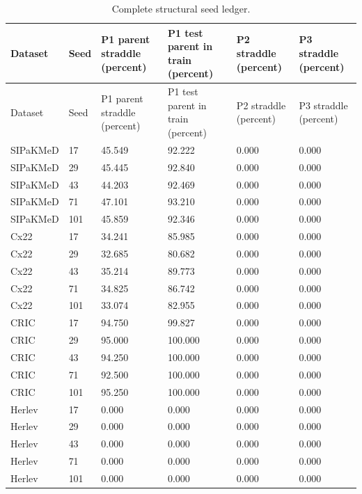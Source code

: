 \begin{longtable}{p{2.0cm}p{1.0cm}p{2.5cm}p{2.8cm}p{2.5cm}p{2.5cm}}
\caption{Complete structural seed ledger.}\label{s1:tab:structural-seed-ledger}\\
\toprule
Dataset & Seed & P1 parent straddle (percent) & P1 test parent in train (percent) & P2 straddle (percent) & P3 straddle (percent) \\
\midrule
\endfirsthead
\toprule
Dataset & Seed & P1 parent straddle (percent) & P1 test parent in train (percent) & P2 straddle (percent) & P3 straddle (percent) \\
\midrule
\endhead
\bottomrule
\endfoot
SIPaKMeD & 17 & 45.549 & 92.222 & 0.000 & 0.000 \\ 
SIPaKMeD & 29 & 45.445 & 92.840 & 0.000 & 0.000 \\ 
SIPaKMeD & 43 & 44.203 & 92.469 & 0.000 & 0.000 \\ 
SIPaKMeD & 71 & 47.101 & 93.210 & 0.000 & 0.000 \\ 
SIPaKMeD & 101 & 45.859 & 92.346 & 0.000 & 0.000 \\ 
Cx22 & 17 & 34.241 & 85.985 & 0.000 & 0.000 \\ 
Cx22 & 29 & 32.685 & 80.682 & 0.000 & 0.000 \\ 
Cx22 & 43 & 35.214 & 89.773 & 0.000 & 0.000 \\ 
Cx22 & 71 & 34.825 & 86.742 & 0.000 & 0.000 \\ 
Cx22 & 101 & 33.074 & 82.955 & 0.000 & 0.000 \\ 
CRIC & 17 & 94.750 & 99.827 & 0.000 & 0.000 \\ 
CRIC & 29 & 95.000 & 100.000 & 0.000 & 0.000 \\ 
CRIC & 43 & 94.250 & 100.000 & 0.000 & 0.000 \\ 
CRIC & 71 & 92.500 & 100.000 & 0.000 & 0.000 \\ 
CRIC & 101 & 95.250 & 100.000 & 0.000 & 0.000 \\ 
Herlev & 17 & 0.000 & 0.000 & 0.000 & 0.000 \\ 
Herlev & 29 & 0.000 & 0.000 & 0.000 & 0.000 \\ 
Herlev & 43 & 0.000 & 0.000 & 0.000 & 0.000 \\ 
Herlev & 71 & 0.000 & 0.000 & 0.000 & 0.000 \\ 
Herlev & 101 & 0.000 & 0.000 & 0.000 & 0.000 \\ 
\end{longtable}
